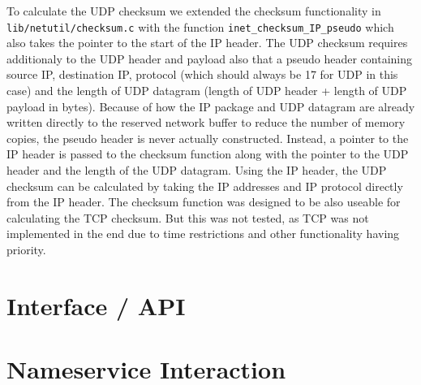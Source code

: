 To calculate the UDP checksum we extended the checksum functionality in \verb|lib/netutil/checksum.c| with the function \verb|inet_checksum_IP_pseudo| which also takes the pointer to the start of the IP header. The UDP checksum requires additionaly to the UDP header and payload also that a pseudo header containing source IP, destination IP, protocol (which should always be 17 for UDP in this case) and the length of UDP datagram (length of UDP header + length of UDP payload in bytes).
Because of how the IP package and UDP datagram are already written directly to the reserved network buffer to reduce the number of memory copies, the pseudo header is never actually constructed. Instead, a pointer to the IP header is passed to the checksum function along with the pointer to the UDP header and the length of the UDP datagram. Using the IP header, the UDP checksum can be calculated by taking the IP addresses and IP protocol directly from the IP header.
The checksum function was designed to be also useable for calculating the TCP checksum. But this was not tested, as TCP was not implemented in the end due to time restrictions and other functionality having priority.

\section{Interface / API}

\section{Nameservice Interaction}